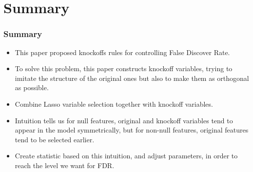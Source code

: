 \documentclass{beamer}
\begin{document}
\section{Summary}
\begin{frame}
\frametitle{Summary}
\begin{itemize}
\item This paper proposed knockoffs rules for controlling False Discover Rate.
\item To solve this problem, this paper constructs knockoff variables, trying to imitate the structure of the original ones but also to make them as orthogonal as possible.
\item Combine Lasso variable selection together with knockoff variables.
\item Intuition tells us for null features, original and knockoff variables tend to appear in the model symmetrically, but for non-null features, original features tend to be selected earlier.
\item Create statistic based on this intuition, and adjust parameters, in order to reach the level we want for FDR.
\end{itemize}	
\end{frame}
\end{document}
